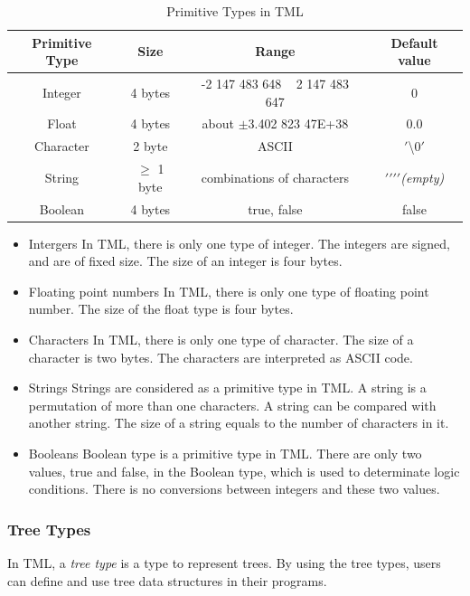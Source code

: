 \documentclass[12pt,psfig,a4]{article}
\begin{document}
\begin{table}[!ht]
\begin{center}
\begin{tabular}{| c | c | c | c |}
\hline
\textbf{Primitive Type} & \textbf{Size} & \textbf{Range} & \textbf{Default value} \\
\hline
Integer & 4 bytes & -2 147 483 648 ~  2 147 483 647 & 0 \\
\hline
Float & 4 bytes & about $\pm$3.402 823 47E+38 & 0.0\\
\hline
Character & 2 byte &  ASCII & $'$\textbackslash$0'$\\  %
\hline
String & $\geq$ 1 byte & combinations of characters & $'$$'$$'$$'$\textit{(empty)} \\
\hline
Boolean & 4 bytes & true, false & false \\
\hline
\end{tabular}
\caption{Primitive Types in TML}
\label{pri_types}
\end {center}
\end{table}


\begin{itemize}
\item Intergers
In TML, there is only one type of integer. The integers are signed, and are of fixed size. The size of an integer is four bytes.

\item Floating point numbers
In TML, there is only one type of floating point number. The size of the float type is four bytes.

\item Characters
In TML, there is only one type of character. The size of a character is two bytes. The characters are interpreted as ASCII code.

\item Strings
Strings are considered as a primitive type in TML. A string is a permutation of more than one characters. A string can be compared with another string. The size of a string equals to the number of characters in it.

\item Booleans
Boolean type is a primitive type in TML. There are only two values, true and false, in the Boolean type, which is used to determinate logic conditions. There is no conversions between integers and these two values.

\end{itemize}

\subsubsection {Tree Types}
In TML, a \textit{tree type} is a type to represent trees. By using the tree types, users can define and use tree data structures in their programs.
\end{document}
